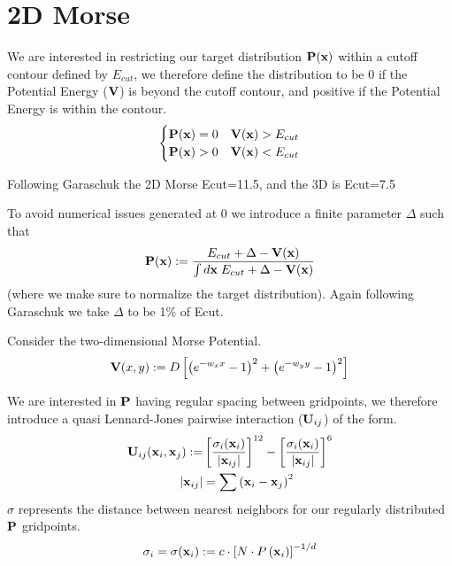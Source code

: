 \documentclass[preprint,showpacs,preprintnumbers,amsmath,amssymb]{revtex4}
\newcommand{\be}{\begin{equation}}
\newcommand{\ee}{\end{equation}}
\newcommand{\bx}{\mbox{\bf x}}        %
\newcommand{\bU}{\mbox{\bf U}}
\newcommand{\bV}{\mbox{\bf V}}
\newcommand{\bP}{\mbox{\bf P}}
\begin{document}
\section*{2D Morse}
We are interested in restricting our target distribution $\bP(\bx)$ within a cutoff contour defined by $E_{cut}$, we therefore define the distribution to be 0 if the Potential Energy ($\bV$) is beyond the cutoff contour, and positive if the Potential Energy is within the contour. 
\[ \begin{cases} 
    \bP(\bx)=0 & \bV(\bx) > E_{cut} \\
    \bP(\bx)>0 & \bV(\bx) < E_{cut} \\
   \end{cases}
\]

Following Garaschuk the 2D Morse Ecut=11.5, and the 3D is Ecut=7.5

To avoid numerical issues generated at 0 we introduce a finite parameter $\Delta$ such that 
\be
\bP(\bx):=\frac{E_{cut}+\Delta - \bV(\bx)}{\int d\bx\; E_{cut}+\Delta - \bV(\bx)}
\ee
(where we make sure to normalize the target distribution). 
Again following Garaschuk we take $\Delta$ to be 1\% of Ecut. 

Consider the two-dimensional Morse Potential.
\be
\bV(x,y):=D\left[\left(e^{-w_xx}-1\right)^2+\left(e^{-w_yy}-1\right)^2\right]
\ee

We are interested in $\bP$ having regular spacing between gridpoints, we therefore introduce a quasi Lennard-Jones pairwise interaction ($\bU_{ij}$) of the form.
\be
\begin{split}
    \bU_{ij}(\bx_i,\bx_j):=&\left[\frac{\sigma_i(\bx_i)}{|\bx_{ij}|}\right]^{12}-\left[\frac{\sigma_i(\bx_i)}{|\bx_{ij}|}\right]^6 \\
    |\bx_{ij}|&=\sum\left(\bx_i-\bx_j\right)^2
\end{split}
\ee
$\sigma$ represents the distance between nearest neighbors for our regularly distributed $\bP$ gridpoints. 
\be
\sigma_i=\sigma(\bx_i) := c\cdot \left[N\cdot P\left(\bx_i\right)\right]^{-1/d}
\ee
\end{document}
